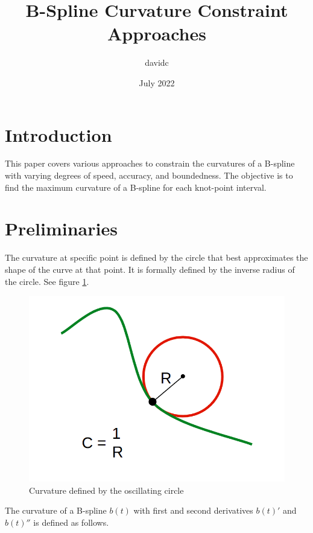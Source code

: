 \documentclass{article}
\title{B-Spline Curvature Constraint Approaches}
\author{davidc}
\date{July 2022}
\begin{document}
\maketitle

\section{Introduction}

This paper covers various approaches to constrain the curvatures of a B-spline with varying degrees of speed, accuracy, and boundedness. The objective is to find the maximum curvature of a B-spline for each knot-point interval.

\section{Preliminaries}

The curvature at specific point is defined by the circle that best approximates the shape of the curve at that point. It is formally defined by the inverse radius of the circle. See figure \ref{Fig:Curvature}. 

\begin{figure}[h]
\begin{center}
\includegraphics[scale=.23]{Curvature.png}
\end{center}
\caption{Curvature defined by the oscillating circle}
\label{Fig:Curvature}
\end{figure}

The curvature of a B-spline \(b(t)\) with first and second derivatives \(b(t)'\) and \(b(t)''\) is defined as follows.
\end{document}
